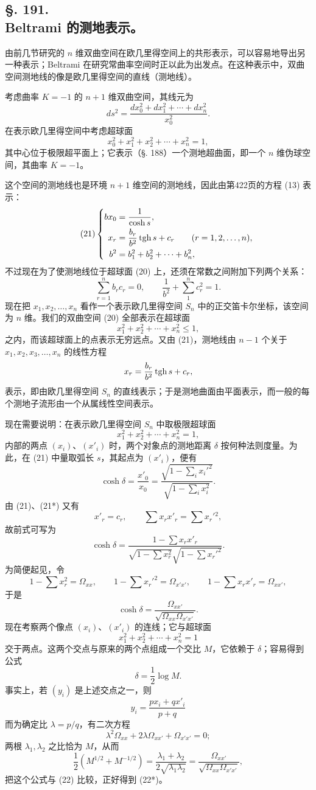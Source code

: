 \subsection*{§. 191.\\ Beltrami 的测地表示。}

由前几节研究的 $n$ 维双曲空间在欧几里得空间上的共形表示，可以容易地导出另一种表示；Beltrami 在研究常曲率空间时正以此为出发点。在这种表示中，双曲空间测地线的像是欧几里得空间的直线（测地线）。

考虑曲率 $K=-1$ 的 $n+1$ 维双曲空间，其线元为
\[
\tag{19}
 ds^2=\frac{dx_0^2+dx_1^2+\cdots+dx_n^2}{x_0^2}.
\]
在表示欧几里得空间中考虑超球面
\[
\tag{20}
 x_0^2+x_1^2+x_2^2+\cdots+x_n^2=1,
\]
其中心位于极限超平面上；它表示（§. 188）一个测地超曲面，即一个 $n$ 维伪球空间，其曲率 $K=-1$。

这个空间的测地线也是环境 $n+1$ 维空间的测地线，因此由第422页的方程 (13) 表示：
\[
\tag{21}
\left\{
\begin{aligned}
 b x_0&=\frac1{\cosh s},\\
 x_r&=\frac{b_r}{b^2}\operatorname{tgh} s+c_r \qquad (r=1,2,\ldots,n),\\
 b^2&=b_1^2+b_2^2+\cdots+b_n^2,
\end{aligned}\right.
\]
不过现在为了使测地线位于超球面 (20) 上，还须在常数之间附加下列两个关系：
\[
\tag{21*}
 \sum_{r=1}^{n} b_r c_r=0,
 \qquad \frac1{b^2}+\sum_1^n c_r^2=1.
\]
现在把 $x_1,x_2,\ldots,x_n$ 看作一个表示欧几里得空间 $S_n$ 中的正交笛卡尔坐标，该空间为 $n$ 维。我们的双曲空间 (20) 全部表示在超球面
\[
 x_1^2+x_2^2+\cdots+x_n^2\leq 1,
\]
之内，而该超球面上的点表示无穷远点。又由 (21)，测地线由 $n-1$ 个关于 $x_1,x_2,x_3,\ldots,x_n$ 的线性方程
\[
 x_r=\frac{b_r}{b^2}\operatorname{tgh} s+c_r,
\]
表示，即由欧几里得空间 $S_n$ 的直线表示；于是测地曲面由平面表示，而一般的每个测地子流形由一个从属线性空间表示。

现在需要说明：在表示欧几里得空间 $S_n$ 中取极限超球面
\[
 x_1^2+x_2^2+\cdots+x_n^2=1,
\]
内部的两点 $(x_i)$、$(x'_i)$ 时，两个对象点的测地距离 $\delta$ 按何种法则度量。为此，在 (21) 中量取弧长 $s$，其起点为 $(x'_i)$，便有
\[
 \cosh\delta=\frac{x'_0}{x_0}=\frac{\sqrt{1-\sum_i x_i'^2}}{\sqrt{1-\sum_i x_i^2}}.
\]
由 (21)、(21*) 又有
\[
 x'_r=c_r,\qquad \sum x_r x'_r=\sum x_r'{}^2,
\]
故前式可写为
\[
 \cosh\delta=\frac{1-\sum x_r x'_r}{\sqrt{1-
 \sum x_r^2}\sqrt{1-\sum x_r'^2}}.
\]
为简便起见，令
\[
 1-\sum x_r^2=\Omega_{xx},\qquad 1-\sum x_r'^2=\Omega_{x'x'},\qquad
 1-\sum x_r x'_r=\Omega_{xx'},
\]
于是
\[
\tag{22}
 \cosh\delta=\frac{\Omega_{xx'}}{\sqrt{\Omega_{xx}\Omega_{x'x'}}}.
\]
现在考察两个像点 $(x_i)$、$(x'_i)$ 的连线；它与超球面
\[
 x_1^2+x_2^2+\cdots+x_n^2=1
\]
交于两点。这两个交点与原来的两个点组成一个交比 $M$，它依赖于 $\delta$；容易得到公式
\[
\tag{22*}
 \delta=\frac12\log M.
\]
事实上，若 $(y_i)$ 是上述交点之一，则
\[
 y_i=\frac{p x_i+q x'_i}{p+q}
\]
而为确定比 $\lambda=p/q$，有二次方程
\[
 \lambda^2\Omega_{xx}+2\lambda\Omega_{xx'}+\Omega_{x'x'}=0;
\]
两根 $\lambda_1,\lambda_2$ 之比恰为 $M$，从而
\[
 \frac12(M^{1/2}+M^{-1/2})=\frac{\lambda_1+\lambda_2}{2\sqrt{\lambda_1\lambda_2}}
 =\frac{\Omega_{xx'}}{\sqrt{\Omega_{xx}\Omega_{x'x'}}},
\]
把这个公式与 (22) 比较，正好得到 (22*)。

